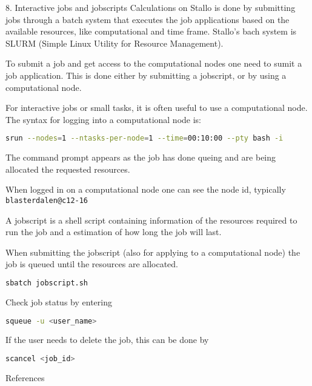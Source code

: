 \documentclass{beamer}
\begin{document}
\begin{frame}[fragile, allowframebreaks=.9,t]{8. Interactive jobs and jobscripts}
Calculations on Stallo is done by submitting jobs through a batch system that executes the job applications based on the available resources, like computational and time frame. Stallo's bach system is SLURM (Simple Linux Utility for Resource Management).

To submit a job and get access to the computational nodes one need to sumit a job application. This is done either by submitting a jobscript, or by using a computational node.

For interactive jobs or small tasks,  it is often useful to use a computational node.
The syntax for logging  into a computational node is:
\begin{lstlisting}[backgroundcolor = \color{light-gray}, language=bash]
srun --nodes=1 --ntasks-per-node=1 --time=00:10:00 --pty bash -i
\end{lstlisting}
The command prompt appears as the job has done queing and are being allocated the requested resources. 

When logged in on a computational node  one can see the node id, typically \texttt{blasterdalen@c12-16}

A jobscript is a shell script containing information of the resources required to run the job and a estimation of how long the job will last. 

When submitting the jobscript (also for applying to a computational node) the job is queued until the resources are allocated. 
\begin{lstlisting}[backgroundcolor = \color{light-gray}, language=bash]
sbatch jobscript.sh
\end{lstlisting}
Check job status by entering
\begin{lstlisting}[backgroundcolor = \color{light-gray}, language=bash]
squeue -u <user_name>
\end{lstlisting}
If the user needs to delete the job, this can be done by 
\begin{lstlisting}[backgroundcolor = \color{light-gray}, language=bash]
scancel <job_id>
\end{lstlisting}


\end{frame}

%

\begin{frame}[fragile,allowframebreaks=1, t]{References}


\end{frame}
\end{document}
